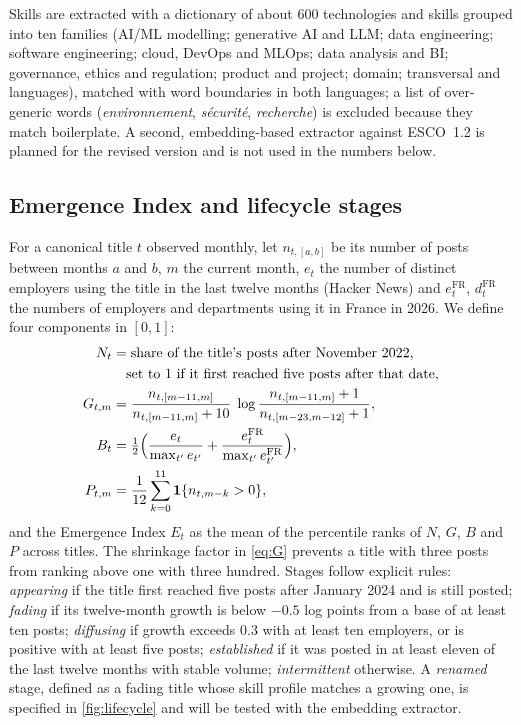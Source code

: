\documentclass[3p,times,10pt,authoryear]{elsarticle}
\begin{document}
Skills are extracted with a dictionary of about 600 technologies and skills grouped into ten families (AI/ML modelling; generative AI and LLM; data engineering; software engineering; cloud, DevOps and MLOps; data analysis and BI; governance, ethics and regulation; product and project; domain; transversal and languages), matched with word boundaries in both languages; a list of over-generic words (\emph{environnement}, \emph{sécurité}, \emph{recherche}) is excluded because they match boilerplate. A second, embedding-based extractor against ESCO~1.2 \citep{esco2024} is planned for the revised version and is not used in the numbers below.

\subsection{Emergence Index and lifecycle stages}\label{sec:index}
For a canonical title $t$ observed monthly, let $n_{t,[a,b]}$ be its number of posts between months $a$ and $b$, $m$ the current month, $e_{t}$ the number of distinct employers using the title in the last twelve months (Hacker News) and $e^{\mathrm{FR}}_{t}$, $d^{\mathrm{FR}}_{t}$ the numbers of employers and departments using it in France in 2026. We define four components in $[0,1]$:
\begin{align}
N_t &= \text{share of the title's posts after November 2022,}\notag\\
    &\quad\text{set to 1 if it first reached five posts after that date},\\
G_{t,m} &= \frac{n_{t,[m-11,m]}}{n_{t,[m-11,m]}+10}\;\log\frac{n_{t,[m-11,m]}+1}{n_{t,[m-23,m-12]}+1},\label{eq:G}\\
B_t &= \tfrac12\Big(\frac{e_t}{\max_{t'} e_{t'}}+\frac{e^{\mathrm{FR}}_t}{\max_{t'} e^{\mathrm{FR}}_{t'}}\Big),\\
P_{t,m} &= \frac{1}{12}\sum_{k=0}^{11}\mathbf 1\{n_{t,m-k}>0\},
\end{align}
and the Emergence Index $E_t$ as the mean of the percentile ranks of $N$, $G$, $B$ and $P$ across titles. The shrinkage factor in \eqref{eq:G} prevents a title with three posts from ranking above one with three hundred. Stages follow explicit rules: \emph{appearing} if the title first reached five posts after January 2024 and is still posted; \emph{fading} if its twelve-month growth is below $-0.5$ log points from a base of at least ten posts; \emph{diffusing} if growth exceeds $0.3$ with at least ten employers, or is positive with at least five posts; \emph{established} if it was posted in at least eleven of the last twelve months with stable volume; \emph{intermittent} otherwise. A \emph{renamed} stage, defined as a fading title whose skill profile matches a growing one, is specified in \cref{fig:lifecycle} and will be tested with the embedding extractor.
\end{document}
